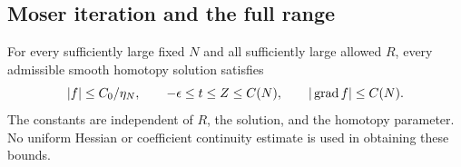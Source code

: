 \subsection{Moser iteration and the full range}

\begin{proposition}\label{four:maximal:prop:bounded-range}
For every sufficiently large fixed $N$ and all sufficiently large
allowed $R$, every admissible smooth homotopy solution satisfies
\begin{equation}\label{four:maximal:bounds:bounded-range}
 |f|\le C_0/\eta_N,\qquad
 -\epsilon\le t\le Z\le C(N),\qquad |\operatorname{grad} f|\le C(N).
\end{equation}
The constants are independent of $R$, the solution, and the homotopy
parameter. No uniform Hessian or coefficient continuity estimate is
used in obtaining these bounds.
\end{proposition}

